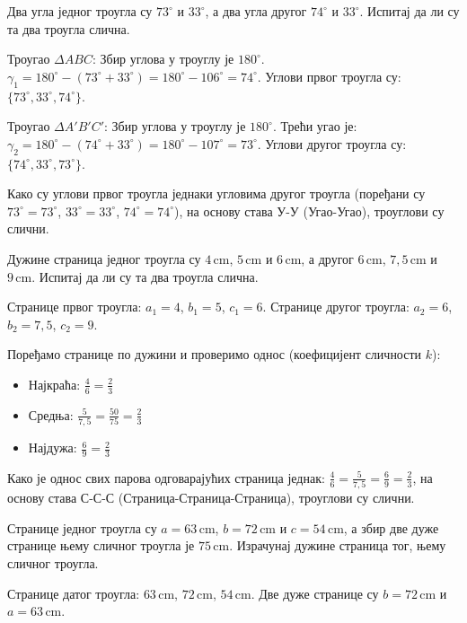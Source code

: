 \documentclass[11pt,a5paper,addpoints]{exam}
\def\measure#1#2{#1 \, \mathrm{#2}}
\begin{document}
\begin{questions}

\question[3]
 Два угла једног троугла су
 $73^\circ$ и
 $33^\circ$, а два угла другог
 $74^\circ$ и
 $33^\circ$.
 Испитај да ли су та два троугла слична.
 \begin{solution}[\stretch 4] %
  Троугао $\Delta ABC$:
  Збир углова у троуглу је $180^\circ$.
  $\gamma_1 = 180^\circ - (73^\circ + 33^\circ) = 180^\circ - 106^\circ = 74^\circ$.
  Углови првог троугла су: $\{73^\circ, 33^\circ, 74^\circ\}$.

  Троугао $\Delta A'B'C'$:
  Збир углова у троуглу је $180^\circ$.
  Трећи угао је: $\gamma_2 = 180^\circ - (74^\circ + 33^\circ) = 180^\circ - 107^\circ = 73^\circ$.
  Углови другог троугла су: $\{74^\circ, 33^\circ, 73^\circ\}$.

  Како су углови првог троугла једнаки угловима другог троугла (поређани су $73^\circ=73^\circ$, $33^\circ=33^\circ$, $74^\circ=74^\circ$), на основу става У-У (Угао-Угао),
  троуглови су слични.
 \end{solution}
 \answerline

\ifprintanswers\else\newpage\fi %

\question[3]
 Дужине страница једног троугла су
 $\measure{4}{cm}$,
 $\measure{5}{cm}$ и
 $\measure{6}{cm}$, а другог
 $\measure{6}{cm}$,
 $\measure{7{,}5}{cm}$ и
 $\measure{9}{cm}$.
 Испитај да ли су та два троугла слична.
 \begin{solution}[\stretch 4] %
  Странице првог троугла: $a_1=4$, $b_1=5$, $c_1=6$.
  Странице другог троугла: $a_2=6$, $b_2=7{,}5$, $c_2=9$.

  Поређамо странице по дужини и проверимо однос (коефицијент сличности $k$):
  \begin{itemize}
      \item Најкраћа: $\frac{4}{6} = \frac{2}{3}$
      \item Средња: $\frac{5}{7{,}5} = \frac{50}{75} = \frac{2}{3}$
      \item Најдужа: $\frac{6}{9} = \frac{2}{3}$
  \end{itemize}
  Како је однос свих парова одговарајућих страница једнак: $\frac{4}{6} = \frac{5}{7{,}5} = \frac{6}{9} = \frac{2}{3}$, на основу става С-С-С (Страница-Страница-Страница),
  троуглови су слични.
 \end{solution}
 \answerline

\question[4]
 Странице једног троугла су
 $a = \measure{63}{cm}$,
 $b = \measure{72}{cm}$ и
 $c = \measure{54}{cm}$,
 а збир две дуже
 странице њему сличног троугла је
 $\measure{75}{cm}$.
 Израчунај дужине страница тог, њему сличног троугла.
 \begin{solution}[\stretch 8] %
  Странице датог троугла: $63\,\mathrm{cm}$, $72\,\mathrm{cm}$, $54\,\mathrm{cm}$.
  Две дуже странице су $b=72\,\mathrm{cm}$ и $a=63\,\mathrm{cm}$.


\end{solution}
\end{questions}
\end{document}
